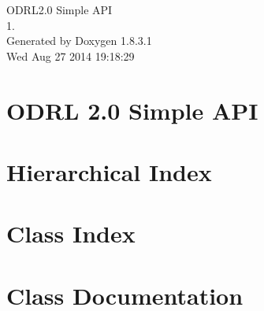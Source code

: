 \documentclass{book}
\begin{document}
\hypersetup{pageanchor=false,citecolor=blue}
\begin{titlepage}
\vspace*{7cm}
\begin{center}
{\Large O\-D\-R\-L2.0 Simple A\-P\-I \\[1ex]\large 1. }\\
\vspace*{1cm}
{\large Generated by Doxygen 1.8.3.1}\\
\vspace*{0.5cm}
{\small Wed Aug 27 2014 19:18:29}\\
\end{center}
\end{titlepage}
\clearemptydoublepage
{}
\tableofcontents
\clearemptydoublepage
{}
\hypersetup{pageanchor=true,citecolor=blue}
\chapter{O\-D\-R\-L 2.0 Simple A\-P\-I}
\label{index}\hypertarget{index}{}
\chapter{Hierarchical Index}

\chapter{Class Index}

\chapter{Class Documentation}














\printindex
\end{document}
